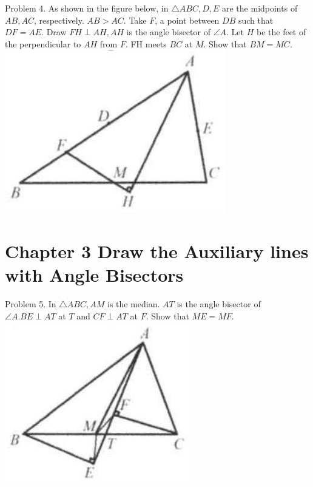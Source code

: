 \documentclass[10pt]{article}
\begin{document}
Problem 4. As shown in the figure below, in \(\triangle A B C, D, E\) are the midpoints of \(A B, A C\), respectively. \(A B>A C\). Take \(F\), a point between \(D B\) such that \(D F=A E\). Draw \(F H \perp A H, A H\) is the angle bisector of \(\angle A\). Let \(H\) be the feet of the perpendicular to \(A H\) from \(F\). FH meets \(B C\) at \(M\). Show that \(B M=M C\).\\
\includegraphics[max width=\textwidth, center]{2025_04_17_97bc1f7e44d93c271a88g-064(2)}

\section*{Chapter 3 Draw the Auxiliary lines with Angle Bisectors}
Problem 5. In \(\triangle A B C, A M\) is the median. \(A T\) is the angle bisector of \(\angle A . B E \perp A T\) at \(T\) and \(C F \perp A T\) at \(F\). Show that \(M E=M F\).\\
\includegraphics[max width=\textwidth, center]{2025_04_17_97bc1f7e44d93c271a88g-065(1)}
\end{document}
